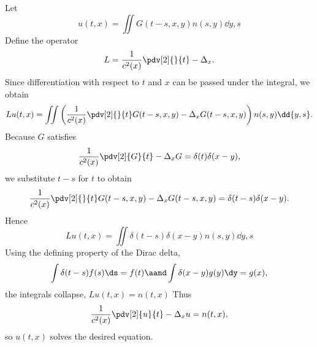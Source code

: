 \begin{solution}
  Let
  \[%
    u(t, x) = \iint G(t - s, x, y)n(s, y) \dd{y,s}
  \]%
  Define the operator
  \[%
    L = \frac{1}{c^2(x)}\pdv[2]{}{t} - \Delta_x
  .\]%
  Since differentiation with respect to $t$ and $x$ can be passed under the integral, we obtain
  \[%
    Lu(t, x) = \iint \left(\frac{1}{c^2(x)}\pdv[2]{}{t}G(t - s, x, y) - \Delta_x G(t - s, x, y)\right) n(s, y) \dd{y,s}
  .\]%
  Because $G$ satisfies
  \[%
    \frac{1}{c^2(x)}\pdv[2]{G}{t} - \Delta_x G = \delta(t)\delta(x - y)
  ,\]%
  we substitute $t - s$ for $t$ to obtain
  \[%
    \frac{1}{c^2(x)}\pdv[2]{}{t}G(t - s, x, y) - \Delta_x G(t - s, x, y) = \delta(t - s)\delta(x - y)
  .\]%
  Hence
  \[%
    Lu(t, x) = \iint \delta(t - s)\delta(x - y)n(s, y) \dd{y,s}
  \]%
  Using the defining property of the Dirac delta,
  \[%
    \int \delta(t - s)f(s) \ds = f(t) \aand \int \delta(x - y)g(y) \dy = g(x)
  ,\]%
  the integrals collapse, $Lu(t, x) = n(t, x)$ Thus
  \[%
    \frac{1}{c^2(x)}\pdv[2]{u}{t} - \Delta_x u = n(t, x)
  ,\]%
  so $u(t,x)$ solves the desired equation.
\end{solution}
